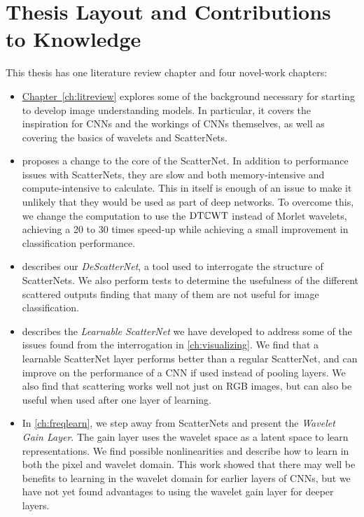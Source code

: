 \section{Thesis Layout and Contributions to Knowledge}
This thesis has one literature review chapter and four novel-work chapters:
\begin{itemize}
\item
  \hyperref[ch:litreview]{Chapter~\ref*{ch:litreview}}
  explores some of the background necessary for starting
  to develop image understanding models. In particular, it covers the
  inspiration for CNNs and the workings of CNNs themselves, as well as covering
  the basics of wavelets and ScatterNets.
\item
   proposes a change to the core of the ScatterNet. In
  addition to performance issues with ScatterNets, they are slow and both
  memory-intensive and compute-intensive to calculate. This in itself is enough of an
  issue to make it unlikely that they would be used as part of deep networks. To
  overcome this, we change the computation to use the $\mathrm{DT}\mathbb{C}\mathrm{WT}$
  \cite{selesnick_dual-tree_2005} instead of Morlet wavelets, achieving a 20 to
  30 times speed-up while achieving a small improvement in classification performance.
\item
   describes our \emph{DeScatterNet}, a tool used to
  interrogate the structure of ScatterNets. We also perform tests to determine
  the usefulness of the different scattered outputs finding that many of them
  are not useful for image classification.
\item
   describes the \emph{Learnable ScatterNet} we have developed to
  address some of the issues found from the interrogation in
  \autoref{ch:visualizing}. We find that a learnable ScatterNet layer performs
  better than a regular ScatterNet, and can improve on the performance of a CNN
  if used instead of pooling layers. We also find that scattering works well not
  just on RGB images, but can also be useful when used after one layer of
  learning.
\item
  In \autoref{ch:freqlearn}, we step away from ScatterNets and present the
  \emph{Wavelet Gain Layer}. The gain layer uses
  the wavelet space as a latent space to learn representations. We find possible
  nonlinearities and describe how to learn in both the pixel and wavelet domain.
  This work showed that there may well be benefits to learning in the wavelet
  domain for earlier layers of CNNs, but we have not yet found advantages to
  using the wavelet gain layer for deeper layers.
\end{itemize}

